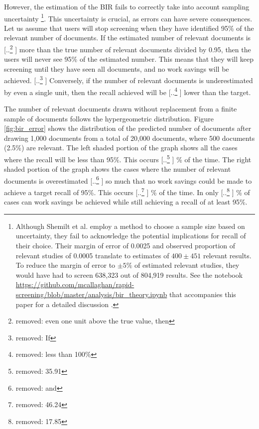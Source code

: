 \documentclass{bmcart}
\providecommand{\DIFadd}[1]{{\protect\color{blue} \sf #1}} %
\providecommand{\DIFdel}[1]{{\protect\color{red} [..\footnote{removed: #1} ]}} %
\providecommand{\DIFaddbegin}{} %
\providecommand{\DIFaddend}{} %
\providecommand{\DIFdelbegin}{} %
\providecommand{\DIFdelend}{} %
\newcommand{\DIFscaledelfig}{0.5}
\newlength{\DIFdelgraphicswidth} %
\newlength{\DIFdelgraphicsheight} %
\newcommand{\DIFaddincludegraphics}[2][]{{\color{blue}\fbox{\DIFOincludegraphics[#1]{#2}}}} %
\newcommand{\DIFdelincludegraphics}[2][]{%
\sbox{\DIFdelgraphicsbox}{\DIFOincludegraphics[#1]{#2}}%
\settoboxwidth{\DIFdelgraphicswidth}{\DIFdelgraphicsbox} %
\settoboxtotalheight{\DIFdelgraphicsheight}{\DIFdelgraphicsbox} %
\scalebox{\DIFscaledelfig}{%
\parbox[b]{\DIFdelgraphicswidth}{\usebox{\DIFdelgraphicsbox}\\[-\baselineskip] \rule{\DIFdelgraphicswidth}{0em}}\llap{\resizebox{\DIFdelgraphicswidth}{\DIFdelgraphicsheight}{%
\setlength{\unitlength}{\DIFdelgraphicswidth}%
\begin{picture}(1,1)%
\thicklines\linethickness{2pt} %
{\color[rgb]{1,0,0}\put(0,0){\framebox(1,1){}}}%
{\color[rgb]{1,0,0}\put(0,0){\line( 1,1){1}}}%
{\color[rgb]{1,0,0}\put(0,1){\line(1,-1){1}}}%
\end{picture}%
}\hspace*{3pt}}} %
} %
\DeclareRobustCommand{\DIFaddbegin}{\DIFOaddbegin \let\includegraphics\DIFaddincludegraphics} %
\DeclareRobustCommand{\DIFaddend}{\DIFOaddend \let\includegraphics\DIFOincludegraphics} %
\DeclareRobustCommand{\DIFdelbegin}{\DIFOdelbegin \let\includegraphics\DIFdelincludegraphics} %
\DeclareRobustCommand{\DIFdelend}{\DIFOaddend \let\includegraphics\DIFOincludegraphics} %
\begin{document}
	
	However, the estimation of the BIR fails to correctly take into account sampling uncertainty \footnote{Although Shemilt et al. \cite{Shemilt2014} employ a method  to choose a sample size based on uncertainty, they fail to acknowledge the potential implications for recall of their choice. Their margin of error of 0.0025 and observed proportion of relevant studies of 0.0005 translate to estimates of $400 \pm 451$ relevant results. To reduce the margin of error to $\pm 5\%$ of estimated relevant studies, they would have had to screen 638,323 out of 804,919 results. See the notebook \url{https://github.com/mcallaghan/rapid-screening/blob/master/analysis/bir_theory.ipynb} that accompanies this paper for a detailed discussion\DIFaddbegin \DIFadd{.}\DIFaddend }. 
	This uncertainty is crucial, as errors can have severe consequences. \DIFaddbegin \DIFadd{Let us assume that users will stop screening when they have identified 95\% of the relevant number of documents. }\DIFaddend If the estimated number of relevant documents is \DIFdelbegin \DIFdel{even one unit above the true value, then }\DIFdelend \DIFaddbegin \DIFadd{more than the true number of relevant documents divided by 0.95, then the users will never see 95\% of the estimated number.  This means that they will keep screening until they have seen all documents, and }\DIFaddend no work savings will be achieved. \DIFdelbegin \DIFdel{If }\DIFdelend \DIFaddbegin \DIFadd{Conversely, if }\DIFaddend the number of relevant documents is underestimated \DIFaddbegin \DIFadd{by even a single unit}\DIFaddend , then the recall achieved will be \DIFdelbegin \DIFdel{less than 100\%}\DIFdelend \DIFaddbegin \DIFadd{lower than the target}\DIFaddend .

	The number of relevant documents drawn without replacement from a finite sample of documents follows the hypergeometric distribution. 
	Figure \ref{fig:bir_error} shows the distribution of the predicted number of documents after drawing 1,000 documents from a total of 20,000 documents, where 500 documents (2.5\%) are relevant. The left shaded portion of the graph shows all the cases where the recall will be less than 95\%. This occurs \DIFdelbegin \DIFdel{35.91}\DIFdelend \DIFaddbegin \DIFadd{48}\DIFaddend \% of the time. The right shaded portion of the graph shows the cases where the number of relevant documents is overestimated \DIFdelbegin \DIFdel{and }\DIFdelend \DIFaddbegin \DIFadd{so much that }\DIFaddend no work savings could be made \DIFaddbegin \DIFadd{to achieve a target recall of 95\%}\DIFaddend . This occurs \DIFdelbegin \DIFdel{46.24}\DIFdelend \DIFaddbegin \DIFadd{29}\DIFaddend \% of the time. In only \DIFdelbegin \DIFdel{17.85}\DIFdelend \DIFaddbegin \DIFadd{23}\DIFaddend \% of cases can work savings be achieved while still achieving a recall of at least 95\%. 
\end{document}
